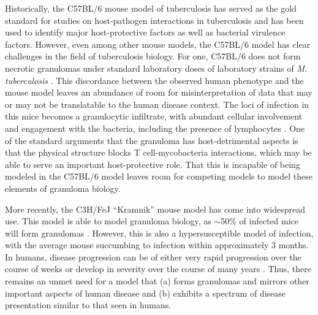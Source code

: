 Historically, the C57BL/6 mouse model of tuberculosis has served as the gold standard for studies on host\hyp{}pathogen interactions in tuberculosis and has been used to identify major host\hyp{}protective factors as well as bacterial virulence factors. However, even among other mouse models, the C57BL/6 model has clear challenges in the field of tuberculosis biology. For one, C57BL/6 does not form necrotic granulomas under standard laboratory doses of laboratory strains of \textit{M. tuberculosis} \citep{Orme1998}. This discordance between the observed human phenotype and the mouse model leaves an abundance of room for misinterpretation of data that may or may not be translatable to the human disease context. The loci of infection in this mice becomes a granulocytic infiltrate, with abundant cellular involvement and engagement with the bacteria, including the presence of lymphocytes \citep{Ulrichs2006, Hunter2007}. One of the standard arguments that the granuloma has host\hyp{}detrimental aspects is that the physical structure blocks T cell\hyp{}mycobacteria interactions, which may be able to serve an important host\hyp{}protective role. That this is incapable of being modeled in the C57BL/6 model leaves room for competing models to model these elements of granuloma biology.

More recently, the C3H/FeJ ``Kramnik'' mouse model has come into widespread use. This model is able to model granuloma biology, as ${\sim}$50\% of infected mice will form granulomas \citep{Harper2012, Lenaerts2015}. However, this is also a hypersusceptible model of infection, with the average mouse succumbing to infection within approximately 3 months. In humans, disease progression can be of either very rapid progression over the course of weeks or develop in severity over the course of many years \citep{Tiemersma2011}. Thus, there remains an unmet need for a model that (a) forms granulomas and mirrors other important aspects of human disease and (b) exhibits a spectrum of disease presentation similar to that seen in humans. 

